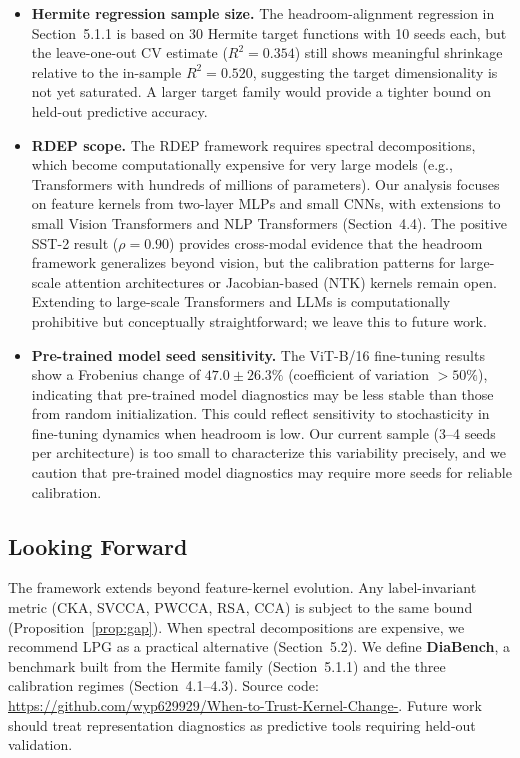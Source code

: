 \documentclass[twoside,11pt]{article}
\begin{document}
\begin{itemize}
    \item \textbf{Hermite regression sample size.}  The headroom-alignment regression in Section~5.1.1 is based on 30 Hermite target functions with 10 seeds each, but the leave-one-out CV estimate ($R^2=0.354$) still shows meaningful shrinkage relative to the in-sample $R^2=0.520$, suggesting the target dimensionality is not yet saturated.  A larger target family would provide a tighter bound on held-out predictive accuracy.
    \item \textbf{RDEP scope.}  The RDEP framework requires spectral decompositions, which become computationally expensive for very large models (e.g., Transformers with hundreds of millions of parameters).  Our analysis focuses on feature kernels from two-layer MLPs and small CNNs, with extensions to small Vision Transformers and NLP Transformers (Section~4.4).  The positive SST-2 result ($\rho=0.90$) provides cross-modal evidence that the headroom framework generalizes beyond vision, but the calibration patterns for large-scale attention architectures or Jacobian-based (NTK) kernels remain open.  Extending to large-scale Transformers and LLMs is computationally prohibitive but conceptually straightforward; we leave this to future work.
    \item \textbf{Pre-trained model seed sensitivity.}  The ViT-B/16 fine-tuning results show a Frobenius change of $47.0\pm26.3\%$ (coefficient of variation $>50\%$), indicating that pre-trained model diagnostics may be less stable than those from random initialization.  This could reflect sensitivity to stochasticity in fine-tuning dynamics when headroom is low.  Our current sample (3--4 seeds per architecture) is too small to characterize this variability precisely, and we caution that pre-trained model diagnostics may require more seeds for reliable calibration.
\end{itemize}

\subsection{Looking Forward}\label{sec:future}

The framework extends beyond feature-kernel evolution. Any label-invariant metric (CKA, SVCCA, PWCCA, RSA, CCA) is subject to the same bound (Proposition~\ref{prop:gap}). When spectral decompositions are expensive, we recommend LPG as a practical alternative (Section~5.2). We define \textbf{DiaBench}, a benchmark built from the Hermite family (Section~5.1.1) and the three calibration regimes (Section~4.1--4.3). Source code: \url{https://github.com/wyp629929/When-to-Trust-Kernel-Change-}. Future work should treat representation diagnostics as predictive tools requiring held-out validation.
\end{document}
